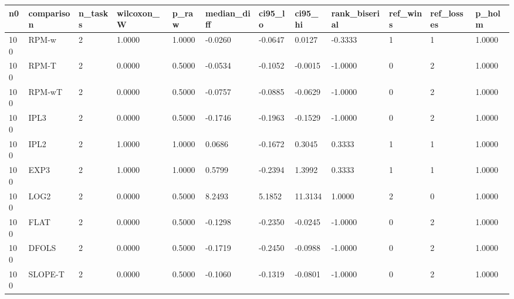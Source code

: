 \begin{tabular}{llllllllllll}
\hline
n0 & comparison & n\_tasks & wilcoxon\_W & p\_raw & median\_diff & ci95\_lo & ci95\_hi & rank\_biserial & ref\_wins & ref\_losses & p\_holm \\
\hline
100 & RPM-w & 2 & 1.0000 & 1.0000 & -0.0260 & -0.0647 & 0.0127 & -0.3333 & 1 & 1 & 1.0000 \\
100 & RPM-T & 2 & 0.0000 & 0.5000 & -0.0534 & -0.1052 & -0.0015 & -1.0000 & 0 & 2 & 1.0000 \\
100 & RPM-wT & 2 & 0.0000 & 0.5000 & -0.0757 & -0.0885 & -0.0629 & -1.0000 & 0 & 2 & 1.0000 \\
100 & IPL3 & 2 & 0.0000 & 0.5000 & -0.1746 & -0.1963 & -0.1529 & -1.0000 & 0 & 2 & 1.0000 \\
100 & IPL2 & 2 & 1.0000 & 1.0000 & 0.0686 & -0.1672 & 0.3045 & 0.3333 & 1 & 1 & 1.0000 \\
100 & EXP3 & 2 & 1.0000 & 1.0000 & 0.5799 & -0.2394 & 1.3992 & 0.3333 & 1 & 1 & 1.0000 \\
100 & LOG2 & 2 & 0.0000 & 0.5000 & 8.2493 & 5.1852 & 11.3134 & 1.0000 & 2 & 0 & 1.0000 \\
100 & FLAT & 2 & 0.0000 & 0.5000 & -0.1298 & -0.2350 & -0.0245 & -1.0000 & 0 & 2 & 1.0000 \\
100 & DFOLS & 2 & 0.0000 & 0.5000 & -0.1719 & -0.2450 & -0.0988 & -1.0000 & 0 & 2 & 1.0000 \\
100 & SLOPE-T & 2 & 0.0000 & 0.5000 & -0.1060 & -0.1319 & -0.0801 & -1.0000 & 0 & 2 & 1.0000 \\
\hline
\end{tabular}
